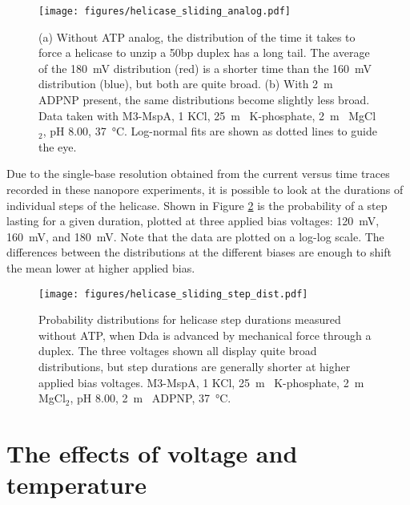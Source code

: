 \begin{figure}[H]
\begin{centering}
\texttt{[image: figures/helicase\_sliding\_analog.pdf]}
\caption[Forced unzipping time depends on the presence of an ATP analog]{(a) Without ATP analog, the distribution of the time it takes to force a helicase to unzip a \num{50}bp duplex has a long tail.  The average of the \SI{180}{\mV} distribution (red) is a shorter time than the \SI{160}{\mV} distribution (blue), but both are quite broad.  (b) With \SI{2}{\m\Molar} ADPNP present, the same distributions become slightly less broad.  Data taken with M3-MspA, \SI{1}{\Molar} KCl, \SI{25}{\m\Molar} K-phosphate, \SI{2}{\m\Molar} MgCl$_2$, pH \num{8.00}, \SI{37}{\celsius}.  Log-normal fits are shown as dotted lines to guide the eye.}
\label{fig:helicase_sliding_analog}
\end{centering}
\end{figure}

Due to the single-base resolution obtained from the current versus time traces recorded in these nanopore experiments, it is possible to look at the durations of individual steps of the helicase.  Shown in Figure \ref{fig:helicase_sliding_time_dist} is the probability of a step lasting for a given duration, plotted at three applied bias voltages: \SI{120}{\mV}, \SI{160}{\mV}, and \SI{180}{\mV}.  Note that the data are plotted on a log-log scale.  The differences between the distributions at the different biases are enough to shift the mean lower at higher applied bias.

\begin{figure}[h]
\begin{centering}
\texttt{[image: figures/helicase\_sliding\_step\_dist.pdf]}
\caption[Distribution of step durations using mechanical force]{Probability distributions for helicase step durations measured without ATP, when Dda is advanced by mechanical force through a duplex.  The three voltages shown all display quite broad distributions, but step durations are generally shorter at higher applied bias voltages.  M3-MspA, \SI{1}{\Molar} KCl, \SI{25}{\m\Molar} K-phosphate, \SI{2}{\m\Molar} MgCl$_2$, pH \num{8.00}, \SI{2}{\m\Molar} ADPNP, \SI{37}{\celsius}.}
\label{fig:helicase_sliding_time_dist}
\end{centering}
\end{figure}

\section{The effects of voltage and temperature}

